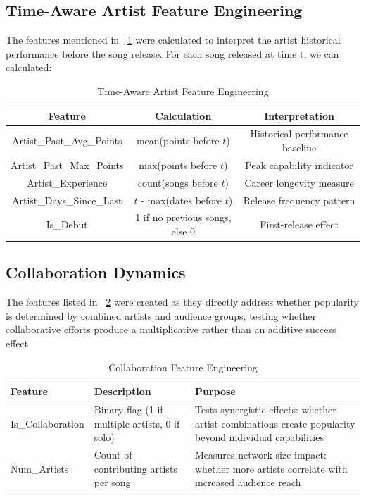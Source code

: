 \documentclass{article}
\begin{document}
\subsection{Time-Aware Artist Feature Engineering}
The features  mentioned in ~\ref{tab:artist_features} were calculated to interpret the artist historical performance before the song release. For each song released at time t, we can calculated:

\begin{table}[h!]
\begin{tabular}{|c|c|c|}
\hline
\textbf{Feature} & \textbf{Calculation} & \textbf{Interpretation} \\
\hline
Artist\_Past\_Avg\_Points & mean(points before $t$) & Historical performance baseline \\
\hline
Artist\_Past\_Max\_Points & max(points before $t$) & Peak capability indicator \\
\hline
Artist\_Experience & count(songs before $t$) & Career longevity measure \\
\hline
Artist\_Days\_Since\_Last & $t$ - max(dates before $t$) & Release frequency pattern \\
\hline
Is\_Debut & 1 if no previous songs, else 0 & First-release effect \\
\hline
\end{tabular}
\centering
\vspace*{0.2cm}
\caption{Time-Aware Artist Feature Engineering}
\label{tab:artist_features}
\end{table}

\vspace*{-0.7cm}
\subsection{Collaboration Dynamics}
The features listed in ~\ref{tab:collaboration_features} were created as they  directly address whether popularity is determined by combined artists and audience groups, testing whether collaborative efforts produce a multiplicative rather than an additive success effect

\begin{table}[h!]
\footnotesize
\begin{tabular}{|p{2.0cm}|p{3.0cm}|p{7.5cm}|}
\hline
\textbf{Feature} & \textbf{Description} & \textbf{Purpose} \\
\hline
Is\_Collaboration & Binary flag (1 if multiple artists, 0 if solo) & Tests synergistic effects: whether artist combinations create popularity beyond individual capabilities \\
\hline
Num\_Artists & Count of contributing artists per song & Measures network size impact: whether more artists correlate with increased audience reach \\
\hline
\end{tabular}
\vspace*{0.2cm}
\centering
\caption{Collaboration Feature Engineering}
\label{tab:collaboration_features}
\end{table}
\end{document}

